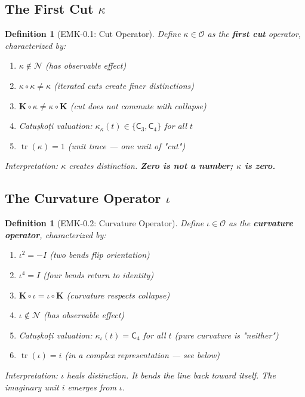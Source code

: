 \documentclass[12pt, oneside]{article}
\newtheorem{definition}[theorem]{Definition}
\DeclareMathOperator{\tr}{tr}
\newcommand{\K}{\mathbf{K}}
\newcommand{\N}{\mathcal{N}}
\newcommand{\Opr}{\mathcal{O}}
\newcommand{\catkothree}{\mathsf{C}_3}
\newcommand{\catkofour}{\mathsf{C}_4}
\begin{document}
\subsection{The First Cut $\kappa$}

\begin{definition}[EMK-0.1: Cut Operator]
Define $\kappa \in \Opr$ as the \textbf{first cut} operator, characterized by:
\begin{enumerate}
    \item $\kappa \notin \N$ (has observable effect)
    \item $\kappa \circ \kappa \neq \kappa$ (iterated cuts create finer distinctions)
    \item $\K \circ \kappa \neq \kappa \circ \K$ (cut does not commute with collapse)
    \item Catuṣkoṭi valuation: $\kappa_\kappa(t) \in \{\catkothree, \catkofour\}$ for all $t$
    \item $\tr(\kappa) = 1$ (unit trace — one unit of "cut")
\end{enumerate}
Interpretation: $\kappa$ creates distinction. \textbf{Zero is not a number; $\kappa$ is zero.}
\end{definition}

\subsection{The Curvature Operator $\iota$}

\begin{definition}[EMK-0.2: Curvature Operator]
Define $\iota \in \Opr$ as the \textbf{curvature operator}, characterized by:
\begin{enumerate}
    \item $\iota^2 = -I$ (two bends flip orientation)
    \item $\iota^4 = I$ (four bends return to identity)
    \item $\K \circ \iota = \iota \circ \K$ (curvature respects collapse)
    \item $\iota \notin \N$ (has observable effect)
    \item Catuṣkoṭi valuation: $\kappa_\iota(t) = \catkofour$ for all $t$ (pure curvature is "neither")
    \item $\tr(\iota) = i$ (in a complex representation — see below)
\end{enumerate}
Interpretation: $\iota$ heals distinction. It bends the line back toward itself. The imaginary unit $i$ emerges from $\iota$.
\end{definition}
\end{document}
